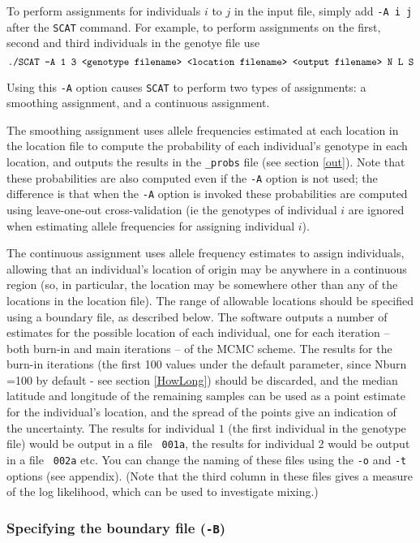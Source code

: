 \documentclass[11pt,titlepage,times,letterpaper]{article}
\def\SCAT{{\tt SCAT} }
\begin{document}
To perform assignments for individuals $i$ to $j$ in the input file,
simply add {\tt -A i j} after the \SCAT command. For example, to
perform assignments on the first, second and third individuals in the
genotye file use
$$\text{\tt ./SCAT -A 1 3 <genotype filename> <location filename> <output
filename> N L S}$$

Using this {\tt -A} option causes \SCAT to perform two types of
assignments: a smoothing assignment, and a continuous assignment.  

The smoothing assignment uses allele frequencies estimated at each
location in the location file to compute the probability of each
individual's genotype in each location, and outputs the results in the
{\tt \_probs} file (see section \ref{out}). Note that these
probabilities are also computed even if the {\tt -A} option is not
used; the difference is that when the {\tt -A} option is invoked these
probabilities are computed using leave-one-out cross-validation (ie
the genotypes of individual $i$ are ignored when estimating allele
frequencies for assigning individual $i$).

The continuous assignment uses allele frequency estimates to assign
individuals, allowing that an individual's location of origin may be
anywhere in a continuous region (so, in particular, the location may
be somewhere other than any of the locations in the location
file). The range of allowable locations should be specified using a
boundary file, as described below. The software outputs a number of
estimates for the possible location of each individual, one for each
iteration -- both burn-in and main iterations -- of the MCMC
scheme. The results for the burn-in iterations (the first 100 values
under the default parameter, since Nburn =100 by default - see section
\ref{HowLong}) should be discarded, and the median latitude and
longitude of the remaining samples can be used as a point estimate for
the individual's location, and the spread of the points give an
indication of the uncertainty. The results for individual $1$ (the
first individual in the genotype file) would be output in a file {\tt
001a}, the results for individual 2 would be output in a file {\tt
002a} etc. You can change the naming of these files using the {\tt -o}
and {\tt -t} options (see appendix). (Note that the third column in
these files gives a measure of the log likelihood, which can be
used to investigate mixing.)


\subsubsection{Specifying the boundary file ({\tt -B})} \label{boundary}
\end{document}
